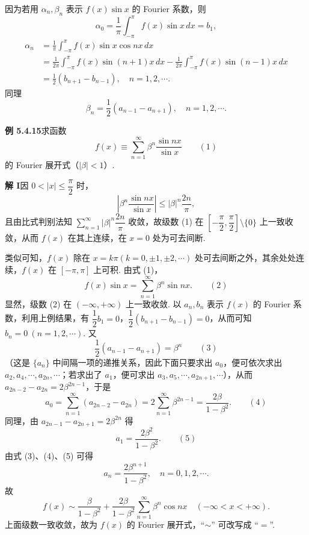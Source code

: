 \documentclass[UTF8,12pt,a4paper,fontset=fandol]{ctexart}
\begin{document}
因为若用 $\alpha_n,\beta_n$ 表示 $f(x)\sin x$ 的 Fourier 系数，则
\[
  \alpha_0=\frac1\pi\int_{-\pi}^{\pi}f(x)\sin x\,dx=b_1,
\]
\[
\begin{aligned}
\alpha_n&=\frac1\pi\int_{-\pi}^{\pi}f(x)\sin x\cos nx\,dx\\
&=\frac1{2\pi}\int_{-\pi}^{\pi}f(x)\sin(n+1)x\,dx
-\frac1{2\pi}\int_{-\pi}^{\pi}f(x)\sin(n-1)x\,dx\\
&=\frac12(b_{n+1}-b_{n-1}),\quad n=1,2,\cdots.
\end{aligned}
\]
同理
\[
  \beta_n=\frac12(a_{n-1}-a_{n+1}),\quad n=1,2,\cdots.
\]

\noindent\textbf{例 5.4.15}\quad 求函数
\[
  f(x)\equiv\sum_{n=1}^{\infty}\beta^n\frac{\sin nx}{\sin x} \qquad(1)
\]
的 Fourier 展开式（$|\beta|<1$）.

\noindent\textbf{解 I}\quad 因 $0<|x|\le\dfrac{\pi}{2}$ 时，
\[
  \left|\beta^n\frac{\sin nx}{\sin x}\right|\le |\beta|^n\frac{2n}{\pi},
\]
且由比式判别法知 $\displaystyle\sum_{n=1}^{\infty}|\beta|^n\dfrac{2n}{\pi}$ 收敛，故级数 (1) 在
$\left[-\dfrac{\pi}{2},\dfrac{\pi}{2}\right]\setminus\{0\}$ 上一致收敛，从而 $f(x)$ 在其上连续，在 $x=0$ 处为可去间断.

类似可知，$f(x)$ 除在 $x=k\pi(k=0,\pm1,\pm2,\cdots)$ 处可去间断之外，其余处处连续，$f(x)$ 在 $[-\pi,\pi]$ 上可积. 由式 (1)，
\[
  f(x)\sin x=\sum_{n=1}^{\infty}\beta^n\sin nx. \qquad(2)
\]
显然，级数 (2) 在 $(-\infty,+\infty)$ 上一致收敛. 以 $a_n,b_n$ 表示 $f(x)$ 的 Fourier 系数，利用上例结果，有
$\dfrac12b_1=0$，$\dfrac12(b_{n+1}-b_{n-1})=0$，从而可知 $b_n=0\ (n=1,2,\cdots)$. 又
\[
  \frac12(a_{n-1}-a_{n+1})=\beta^n \qquad(3)
\]
（这是 $\{a_n\}$ 中间隔一项的递推关系，因此下面只要求出 $a_0$，便可依次求出
$a_2,a_4,\cdots,a_{2n},\cdots$；若求出了 $a_1$，便可求出 $a_3,a_5,\cdots,a_{2n+1},\cdots$），从而
$a_{2n-2}-a_{2n}=2\beta^{2n-1}$，于是
\[
  a_0=\sum_{n=1}^{\infty}(a_{2n-2}-a_{2n})
  =2\sum_{n=1}^{\infty}\beta^{2n-1}=\frac{2\beta}{1-\beta^2}. \qquad(4)
\]
同理，由 $a_{2n-1}-a_{2n+1}=2\beta^{2n}$ 得
\[
  a_1=\frac{2\beta^2}{1-\beta^2}. \qquad(5)
\]
由式 (3)、(4)、(5) 可得
\[
  a_n=\frac{2\beta^{n+1}}{1-\beta^2},\quad n=0,1,2,\cdots.
\]
故
\[
  f(x)\sim\frac{\beta}{1-\beta^2}
  +\frac{2\beta}{1-\beta^2}\sum_{n=1}^{\infty}\beta^n\cos nx\quad(-\infty<x<+\infty).
\]
上面级数一致收敛，故为 $f(x)$ 的 Fourier 展开式，``$\sim$'' 可改写成 ``$=$''.
\end{document}
